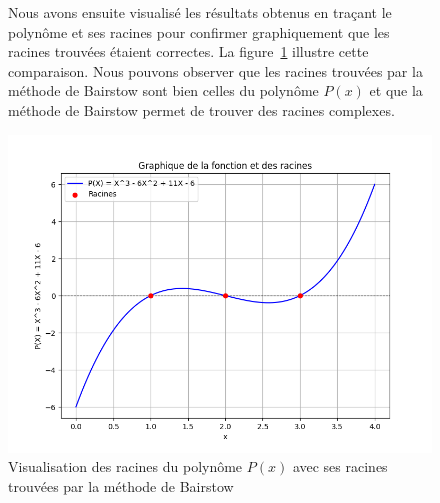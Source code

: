 \documentclass{article}
\begin{document}
\begin{figure}[H]
  \centering
  \begin{minipage}{0.45\textwidth}
  Nous avons ensuite visualisé les résultats obtenus en traçant le polynôme et ses racines pour confirmer graphiquement que les racines trouvées étaient correctes. La figure~\ref{fig:bairstow-plot} illustre cette comparaison. Nous pouvons observer que les racines trouvées par la méthode de Bairstow sont bien celles du polynôme \(P(x)\) et que la méthode de Bairstow permet de trouver des racines complexes.
  \end{minipage}%
  \hfill
  \begin{minipage}{0.5\textwidth}
  \includegraphics[width=\textwidth]{berstow.png}
  \caption{Visualisation des racines du polynôme \(P(x)\) avec ses racines trouvées par la méthode de Bairstow}
  \label{fig:bairstow-plot}
  \end{minipage}
\end{figure}
\end{document}

